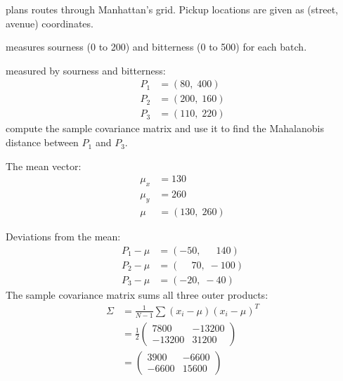  plans routes through Manhattan's grid. Pickup locations are given as (street, avenue) coordinates.

 measures sourness (0 to 200) and bitterness (0 to 500)
for each batch.


\vspace{2.5em}
 measured by sourness and bitterness:
\begin{align*}
    P_1 &= (80,\; 400) \\
    P_2 &= (200,\; 160) \\
    P_3 &= (110,\; 220)
\end{align*}
compute the sample covariance matrix and use it to find the Mahalanobis distance between $P_1$ and $P_3$.

The mean vector:
\begin{align*}
    \mu_x &= 130 \\
    \mu_y &= 260 \\[4pt]
    \mu   &= (130,\; 260)
\end{align*}

Deviations from the mean:
\begin{align*}
    P_1 - \mu &= (-50,\;\phantom{-}140) \\
    P_2 - \mu &= (\phantom{-}70,\;-100) \\
    P_3 - \mu &= (-20,\; -40)
\end{align*}
The sample covariance matrix sums all three outer products:
\begin{align*}
    \Sigma &= \frac{1}{N{-}1}\sum (x_i - \mu)(x_i - \mu)^T \\[4pt]
           &= \frac{1}{2}\begin{pmatrix} 7800 & -13200 \\ -13200 & 31200 \end{pmatrix} \\[4pt]
           &= \begin{pmatrix} 3900 & -6600 \\ -6600 & 15600 \end{pmatrix}
\end{align*}

